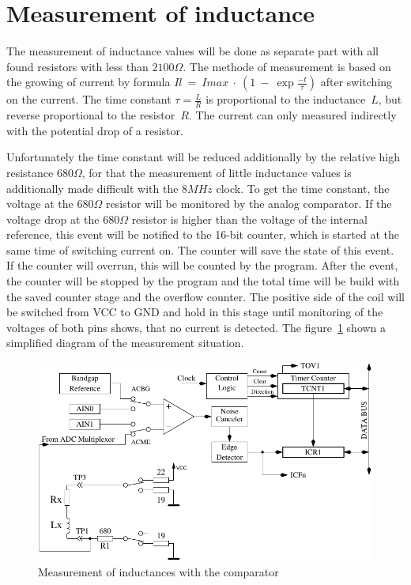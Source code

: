 \section{Measurement of inductance}
The measurement of inductance values will be done as separate part with all found resistors with
less than \(2100\Omega\).
The methode of measurement is based on the growing of current by formula \(Il~=~Imax~\cdot~(1~-~\exp{\frac{-t}{\tau}})\) 
after switching on the current.
The time constant \(\tau = \frac{L}{R}\) is proportional to the inductance~\(L\), but reverse proportional to the
resistor~\(R\). 
The current can only measured indirectly with the potential drop of a resistor.

Unfortunately the time constant will be reduced additionally by the relative high resistance \(680\Omega\),
for that the measurement of little inductance values is additionally made difficult with the \(8MHz\) clock.
To get the time constant, the voltage at the \(680\Omega\) resistor will be monitored by the analog
comparator.
If the voltage drop at the \(680\Omega\) resistor is higher than the voltage of the internal reference, this
event will be notified to the 16-bit counter, which is started at the same time of switching current on.
The counter will save the state of this event.
If the counter will overrun, this will be counted by the program.
After the event, the counter will be stopped by the program and the total time will be build with the saved
counter stage and the overflow counter.
The positive side of the coil will be switched from VCC to GND and hold in this stage until  monitoring 
of the voltages of both pins shows, that no current is detected.
The figure~\ref{fig:Inductance} shown a simplified diagram of the measurement situation.

\begin{figure}[H]
\centering
\includegraphics[width=.8\textwidth]{../FIG/Inductance.pdf}
\caption{Measurement of inductances with the comparator}
\label{fig:Inductance}
\end{figure}

